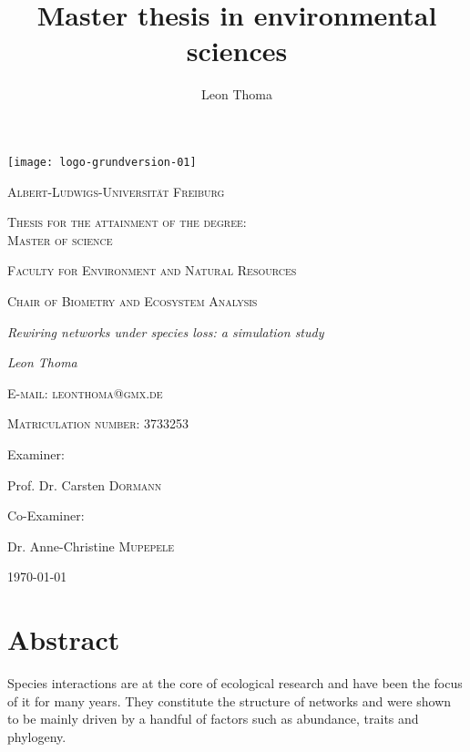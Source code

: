 \documentclass[12pt,a4paper]{article}
\author{Leon Thoma}
\title{Master thesis in environmental sciences}
\begin{document}
\begin{titlepage}
	\centering
	\texttt{[image: logo-grundversion-01]}\par\vspace{1cm}
	{\scshape\large Albert-Ludwigs-Universität Freiburg\par}
	\vspace{1.25cm}
	{\scshape\large Thesis for the attainment of the degree:\\ Master of science\par}
	\vspace{.75cm}
	{\scshape\large Faculty for Environment and Natural Resources\par}
	\vspace{.75cm}
	{\scshape\large Chair of Biometry and Ecosystem Analysis\par}
	\vspace{.75cm}
	{\Large\itshape Rewiring networks under species loss: a simulation
study
\par}
	\vspace{.75cm}
	{\Large\itshape Leon Thoma\par}
	\vspace{.25cm}
	{\scshape\normalsize E-mail: leonthoma@gmx.de\par}
	\vspace{.15cm}
	{\scshape\normalsize Matriculation number: 3733253\par}
	\vspace{.75cm}
	\large Examiner:\par
	\large Prof. Dr. Carsten  \textsc{Dormann} \par
	\vspace{.5cm}
	\large Co-Examiner:\par
	\large Dr. Anne-Christine \textsc{Mupepele}
	\vfill

	{\large \today\par}
\end{titlepage}
	\tableofcontents
	\newpage	
	
\listoffigures
\listoftables
	\section{Abstract} 
Species interactions are at the core of ecological research and have been the focus of it for many years. They constitute the structure of networks and were shown to be mainly driven by a handful of factors such as abundance, traits and phylogeny. 
\end{document}
